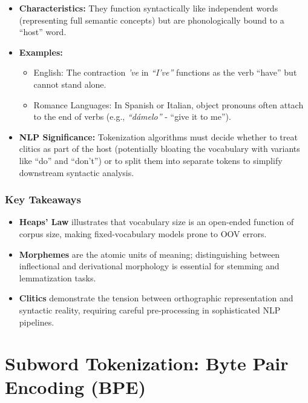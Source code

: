 \documentclass[
  italian,
  11pt,
]{article}
\providecommand{\tightlist}{%
  \setlength{\itemsep}{0pt}\setlength{\parskip}{0pt}}
\begin{document}
\begin{itemize}
\tightlist
\item
  \textbf{Characteristics:} They function syntactically like independent
  words (representing full semantic concepts) but are phonologically
  bound to a ``host'' word.
\item
  \textbf{Examples:}

  \begin{itemize}
  \tightlist
  \item
    English: The contraction \emph{'ve} in \emph{``I've''} functions as
    the verb ``have'' but cannot stand alone.
  \item
    Romance Languages: In Spanish or Italian, object pronouns often
    attach to the end of verbs (e.g., \emph{``dámelo''} - ``give it to
    me'').
  \end{itemize}
\item
  \textbf{NLP Significance:} Tokenization algorithms must decide whether
  to treat clitics as part of the host (potentially bloating the
  vocabulary with variants like ``do'' and ``don't'') or to split them
  into separate tokens to simplify downstream syntactic analysis.
\end{itemize}

\subsubsection{Key Takeaways}\label{key-takeaways-2}

\begin{itemize}
\tightlist
\item
  \textbf{Heaps' Law} illustrates that vocabulary size is an open-ended
  function of corpus size, making fixed-vocabulary models prone to OOV
  errors.
\item
  \textbf{Morphemes} are the atomic units of meaning; distinguishing
  between inflectional and derivational morphology is essential for
  stemming and lemmatization tasks.
\item
  \textbf{Clitics} demonstrate the tension between orthographic
  representation and syntactic reality, requiring careful pre-processing
  in sophisticated NLP pipelines.
\end{itemize}

\newpage

\section{Subword Tokenization: Byte Pair Encoding
(BPE)}\label{subword-tokenization-byte-pair-encoding-bpe}
\end{document}
